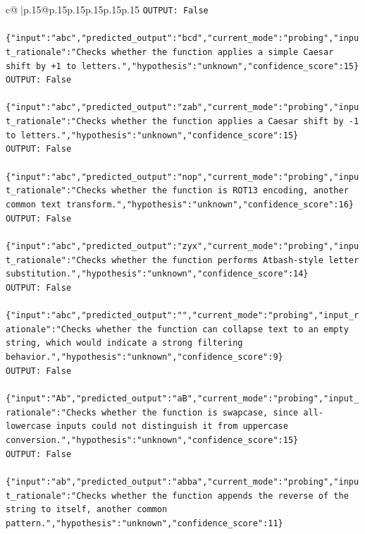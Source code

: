 \documentclass{article}
\begin{document}
{\begin{supertabular}{c@{$\;$}|p{.15\linewidth}@{}p{.15\linewidth}p{.15\linewidth}p{.15\linewidth}p{.15\linewidth}p{.15\linewidth}}
{{{\texttt{OUTPUT: False} \\
\\ 
\texttt{\{"input":"abc","predicted\_output":"bcd","current\_mode":"probing","input\_rationale":"Checks whether the function applies a simple Caesar shift by +1 to letters.","hypothesis":"unknown","confidence\_score":15\}} \\
\texttt{OUTPUT: False} \\
\\ 
\texttt{\{"input":"abc","predicted\_output":"zab","current\_mode":"probing","input\_rationale":"Checks whether the function applies a Caesar shift by {-}1 to letters.","hypothesis":"unknown","confidence\_score":15\}} \\
\texttt{OUTPUT: False} \\
\\ 
\texttt{\{"input":"abc","predicted\_output":"nop","current\_mode":"probing","input\_rationale":"Checks whether the function is ROT13 encoding, another common text transform.","hypothesis":"unknown","confidence\_score":16\}} \\
\texttt{OUTPUT: False} \\
\\ 
\texttt{\{"input":"abc","predicted\_output":"zyx","current\_mode":"probing","input\_rationale":"Checks whether the function performs Atbash{-}style letter substitution.","hypothesis":"unknown","confidence\_score":14\}} \\
\texttt{OUTPUT: False} \\
\\ 
\texttt{\{"input":"abc","predicted\_output":"","current\_mode":"probing","input\_rationale":"Checks whether the function can collapse text to an empty string, which would indicate a strong filtering behavior.","hypothesis":"unknown","confidence\_score":9\}} \\
\texttt{OUTPUT: False} \\
\\ 
\texttt{\{"input":"Ab","predicted\_output":"aB","current\_mode":"probing","input\_rationale":"Checks whether the function is swapcase, since all{-}lowercase inputs could not distinguish it from uppercase conversion.","hypothesis":"unknown","confidence\_score":15\}} \\
\texttt{OUTPUT: False} \\
\\ 
\texttt{\{"input":"ab","predicted\_output":"abba","current\_mode":"probing","input\_rationale":"Checks whether the function appends the reverse of the string to itself, another common pattern.","hypothesis":"unknown","confidence\_score":11\}} \\
}}}
\end{supertabular}}
\end{document}
